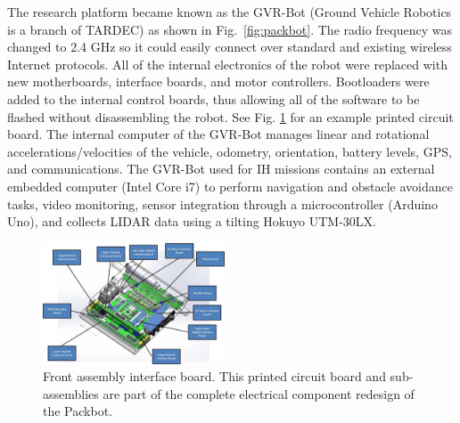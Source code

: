 The research platform became known as the GVR-Bot (Ground Vehicle Robotics is a branch of TARDEC) as shown in Fig.~\ref{fig:packbot}. The radio frequency was changed to 2.4 GHz so it could easily connect over standard and existing wireless Internet protocols. All of the internal electronics of the robot were replaced with new motherboards, interface boards, and motor controllers. Bootloaders were added to the internal control boards, thus allowing all of the software to be flashed without disassembling the robot. See Fig. \ref{fig:pcb} for an example printed circuit board. The internal computer of the GVR-Bot manages linear and rotational accelerations/velocities of the vehicle, odometry, orientation, battery levels, GPS, and communications. The GVR-Bot used for IH missions contains an external embedded computer (Intel Core i7) to perform navigation and obstacle avoidance tasks, video monitoring, sensor integration through a microcontroller (Arduino Uno), and collects LIDAR data using a tilting Hokuyo UTM-30LX.   

\begin{figure}[b]
	\centering
	\includegraphics[width=0.48\textwidth]{./pictures/pcb.jpg}
	\caption{Front assembly interface board. This printed circuit board and sub-assemblies are part of the complete electrical component redesign of the Packbot.}
	\label{fig:pcb}
\end{figure}

